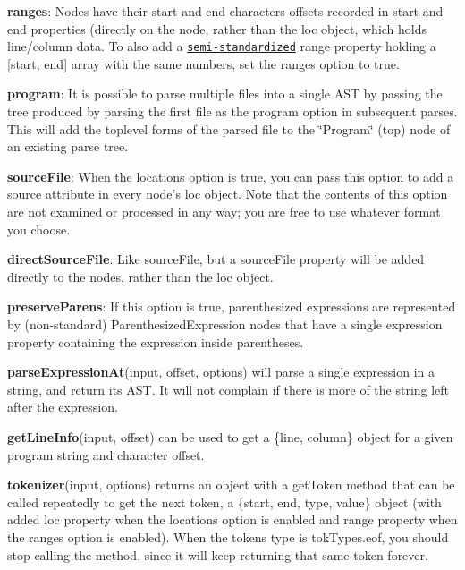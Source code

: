 \begin{DoxyItemize}
\item {\bfseries ranges}\+: Nodes have their start and end characters offsets recorded in {\ttfamily start} and {\ttfamily end} properties (directly on the node, rather than the {\ttfamily loc} object, which holds line/column data. To also add a \href{https://bugzilla.mozilla.org/show_bug.cgi?id=745678}{\tt semi-\/standardized} {\ttfamily range} property holding a {\ttfamily \mbox{[}start, end\mbox{]}} array with the same numbers, set the {\ttfamily ranges} option to {\ttfamily true}.
\item {\bfseries program}\+: It is possible to parse multiple files into a single A\+ST by passing the tree produced by parsing the first file as the {\ttfamily program} option in subsequent parses. This will add the toplevel forms of the parsed file to the \char`\"{}\+Program\char`\"{} (top) node of an existing parse tree.
\item {\bfseries source\+File}\+: When the {\ttfamily locations} option is {\ttfamily true}, you can pass this option to add a {\ttfamily source} attribute in every node’s {\ttfamily loc} object. Note that the contents of this option are not examined or processed in any way; you are free to use whatever format you choose.
\item {\bfseries direct\+Source\+File}\+: Like {\ttfamily source\+File}, but a {\ttfamily source\+File} property will be added directly to the nodes, rather than the {\ttfamily loc} object.
\item {\bfseries preserve\+Parens}\+: If this option is {\ttfamily true}, parenthesized expressions are represented by (non-\/standard) {\ttfamily Parenthesized\+Expression} nodes that have a single {\ttfamily expression} property containing the expression inside parentheses.
\end{DoxyItemize}

{\bfseries parse\+Expression\+At}{\ttfamily (input, offset, options)} will parse a single expression in a string, and return its A\+ST. It will not complain if there is more of the string left after the expression.

{\bfseries get\+Line\+Info}{\ttfamily (input, offset)} can be used to get a {\ttfamily \{line, column\}} object for a given program string and character offset.

{\bfseries tokenizer}{\ttfamily (input, options)} returns an object with a {\ttfamily get\+Token} method that can be called repeatedly to get the next token, a {\ttfamily \{start, end, type, value\}} object (with added {\ttfamily loc} property when the {\ttfamily locations} option is enabled and {\ttfamily range} property when the {\ttfamily ranges} option is enabled). When the token\textquotesingle{}s type is {\ttfamily tok\+Types.\+eof}, you should stop calling the method, since it will keep returning that same token forever.

